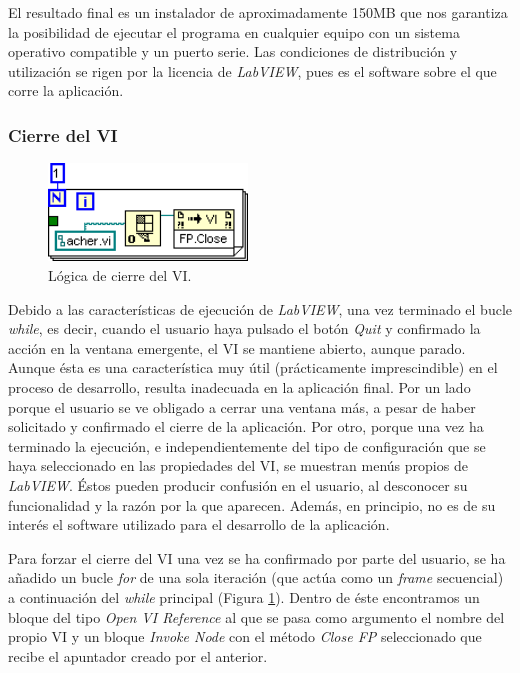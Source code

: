 El resultado final es un instalador de aproximadamente 150MB que nos garantiza la posibilidad de ejecutar el programa en cualquier equipo con un sistema operativo compatible y un puerto serie. Las condiciones de distribución y utilización se rigen por la licencia de \textit{LabVIEW}, pues es el software sobre el que corre la aplicación.

\subsubsection{Cierre del VI}

\begin{figure}[!htp]
\centering
\includegraphics[width=150pt]{./images/acher_close.png}
\caption{Lógica de cierre del VI.}
\label{fig:acher_close}
\end{figure}

Debido a las características de ejecución de \textit{LabVIEW}, una vez terminado el bucle \textit{while}, es decir, cuando el usuario haya pulsado el botón \textit{Quit} y confirmado la acción en la ventana emergente, el VI se mantiene abierto, aunque parado. Aunque ésta es una característica muy útil (prácticamente imprescindible) en el proceso de desarrollo, resulta inadecuada en la aplicación final. Por un lado porque el usuario se ve obligado a cerrar una ventana más, a pesar de haber solicitado y confirmado el cierre de la aplicación. Por otro, porque una vez ha terminado la ejecución, e independientemente del tipo de configuración que se haya seleccionado en las propiedades del VI, se muestran menús propios de \textit{LabVIEW}. Éstos pueden producir confusión en el usuario, al desconocer su funcionalidad y la razón por la que aparecen. Además, en principio, no es de su interés el software utilizado para el desarrollo de la aplicación.

Para forzar el cierre del VI\cite{closevi} una vez se ha confirmado por parte del usuario, se ha añadido un bucle \textit{for} de una sola iteración (que actúa como un \textit{frame} secuencial) a continuación del \textit{while} principal (Figura \ref{fig:acher_close}). Dentro de éste encontramos un bloque del tipo \textit{Open VI Reference} al que se pasa como argumento el nombre del propio VI y un bloque \textit{Invoke Node} con el método \textit{Close FP} seleccionado que recibe el apuntador creado por el anterior.